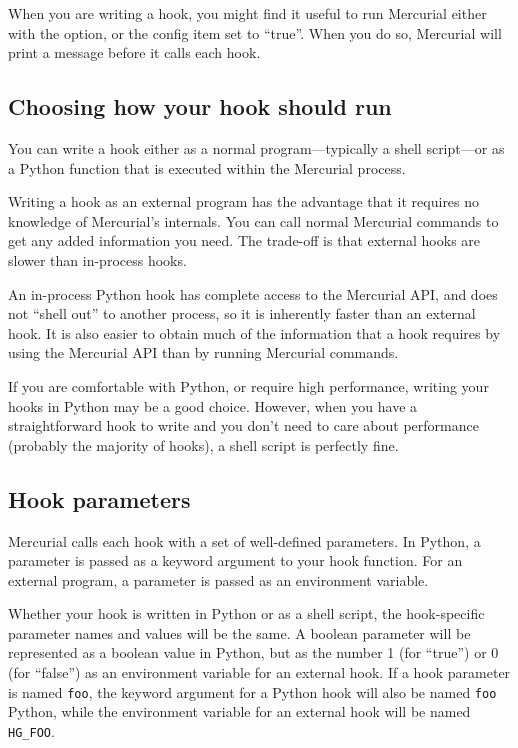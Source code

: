 When you are writing a hook, you might find it useful to run Mercurial
either with the  option, or the  config
item set to ``true''.  When you do so, Mercurial will print a message
before it calls each hook.

\subsection{Choosing how your hook should run}
\label{sec:hook:lang}

You can write a hook either as a normal program---typically a shell
script---or as a Python function that is executed within the Mercurial
process.

Writing a hook as an external program has the advantage that it
requires no knowledge of Mercurial's internals.  You can call normal
Mercurial commands to get any added information you need.  The
trade-off is that external hooks are slower than in-process hooks.

An in-process Python hook has complete access to the Mercurial API,
and does not ``shell out'' to another process, so it is inherently
faster than an external hook.  It is also easier to obtain much of the
information that a hook requires by using the Mercurial API than by
running Mercurial commands.

If you are comfortable with Python, or require high performance,
writing your hooks in Python may be a good choice.  However, when you
have a straightforward hook to write and you don't need to care about
performance (probably the majority of hooks), a shell script is
perfectly fine.

\subsection{Hook parameters}
\label{sec:hook:param}

Mercurial calls each hook with a set of well-defined parameters.  In
Python, a parameter is passed as a keyword argument to your hook
function.  For an external program, a parameter is passed as an
environment variable.

Whether your hook is written in Python or as a shell script, the
hook-specific parameter names and values will be the same.  A boolean
parameter will be represented as a boolean value in Python, but as the
number 1 (for ``true'') or 0 (for ``false'') as an environment
variable for an external hook.  If a hook parameter is named
\texttt{foo}, the keyword argument for a Python hook will also be
named \texttt{foo} Python, while the environment variable for an
external hook will be named \texttt{HG\_FOO}.

